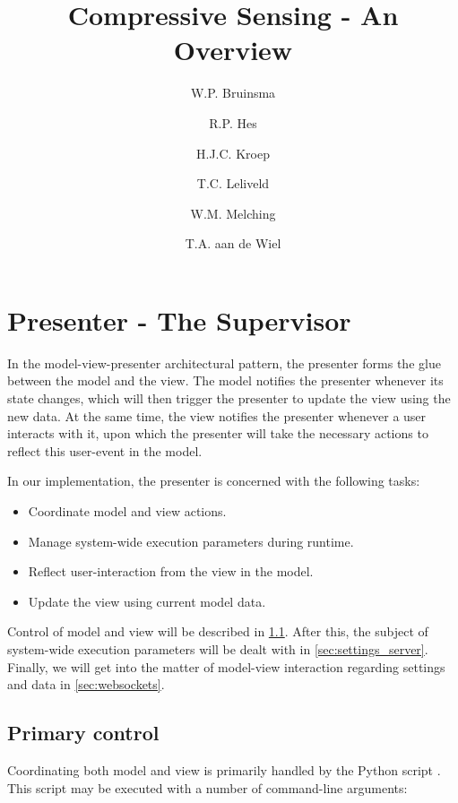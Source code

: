 \documentclass[a4paper, openany, oneside]{memoir}
\title{Compressive Sensing - An Overview}
\author{W.P. Bruinsma \and R.P. Hes \and H.J.C. Kroep \and T.C. Leliveld \and W.M. Melching \and T.A. aan de Wiel}
\begin{document}
\chapter{Presenter - The Supervisor}
\label{cha:presenter}
In the model-view-presenter architectural pattern, the presenter forms the glue between the model and the view. The model notifies the presenter whenever its state changes, which will then trigger the presenter to update the view using the new data. At the same time, the view notifies the presenter whenever a user interacts with it, upon which the presenter will take the necessary actions to reflect this user-event in the model.

In our implementation, the presenter is concerned with the following tasks:
\begin{itemize}
	\item Coordinate model and view actions.
	\item Manage system-wide execution parameters during runtime.
	\item Reflect user-interaction from the view in the model.
	\item Update the view using current model data.
\end{itemize}

Control of model and view will be described in \cref{sec:control}. After this, the subject of system-wide execution parameters will be dealt with in \cref{sec:settings_server}. Finally, we will get into the matter of model-view interaction regarding settings and data in \cref{sec:websockets}.

\section{Primary control}
\label{sec:control}
Coordinating both model and view is primarily handled by the Python script . This script may be executed with a number of command-line arguments:
\end{document}
